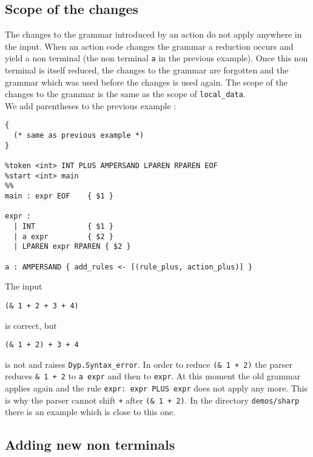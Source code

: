 \documentclass[12pt]{article}
\begin{document}
{\subsection{Scope of the changes}

The changes to the grammar introduced by an action do not apply anywhere in the input. When an action code changes the grammar a reduction occurs and yield a non terminal (the non terminal \texttt{a} in the previous example). Once this non terminal is itself reduced, the changes to the grammar are forgotten and the grammar which was used before the changes is used again. The scope of the changes to the grammar is the same as the scope of \verb|local_data|.\\

We add parentheses to the previous example :

\begin{verbatim}
{
  (* same as previous example *)
}

%token <int> INT PLUS AMPERSAND LPAREN RPAREN EOF
%start <int> main
%%
main : expr EOF    { $1 }

expr :
  | INT            { $1 }
  | a expr         { $2 }
  | LPAREN expr RPAREN { $2 }

a : AMPERSAND { add_rules <- [(rule_plus, action_plus)] }
\end{verbatim}

The input
\begin{verbatim}
(& 1 + 2 + 3 + 4)
\end{verbatim}
is correct, but
\begin{verbatim}
(& 1 + 2) + 3 + 4
\end{verbatim}
is not and raises \verb|Dyp.Syntax_error|. In order to reduce \texttt{(\& 1 + 2)} the parser reduces \texttt{\& 1 + 2} to \texttt{a expr} and then to \texttt{expr}. At this moment the old grammar applies again and the rule \texttt{expr: expr PLUS expr} does not apply any more. This is why the parser cannot shift \texttt{+} after \texttt{(\& 1 + 2)}. In the directory \texttt{demos/sharp} there is an example which is close to this one.

\subsection{Adding new non terminals}\label{new nt}

}
\end{document}
